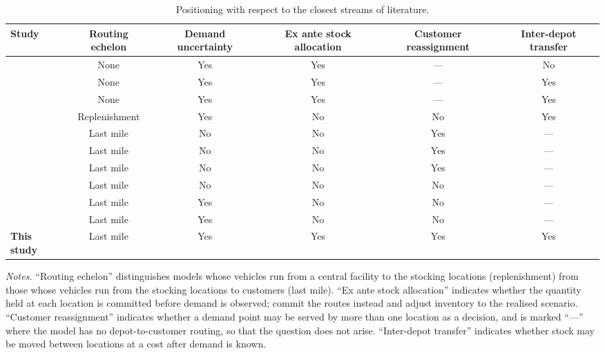 \documentclass[authoryear,final,3p,times]{elsarticle}
\theoremstyle{definition}
\theoremstyle{plain}
\begin{document}
\begin{table}[!htbp]
\centering
\caption{Positioning with respect to the closest streams of literature.}
\label{tab:literature_taxonomy}
\footnotesize
\setlength{\tabcolsep}{4pt}
\renewcommand{\arraystretch}{1.15}
\begin{tabular}{@{}lccccc@{}}
\toprule
Study & Routing echelon & Demand uncertainty & Ex ante stock allocation & Customer reassignment & Inter-depot transfer \\
\midrule
\citet{eppen1979centralization}   & None            & Yes & Yes & ---  & No  \\
\citet{ozdemir2006capacitated}    & None            & Yes & Yes & ---  & Yes \\
\citet{rosales2013retailer}       & None            & Yes & Yes & ---  & Yes \\
\citet{achamrah2022spare}         & Replenishment   & Yes & No  & No   & Yes \\
\citet{renaud1996tabu}            & Last mile       & No  & No  & Yes  & --- \\
\citet{cordeau1997vrp}            & Last mile       & No  & No  & Yes  & --- \\
\citet{vidal2012hybrid}           & Last mile       & No  & No  & Yes  & --- \\
\citet{bektas2011pollution}       & Last mile       & No  & No  & No   & --- \\
\citet{bertsimas1992vehicle}      & Last mile       & Yes & No  & No   & --- \\
\citet{laporte2002integer}        & Last mile       & Yes & No  & No   & --- \\
\textbf{This study}               & Last mile       & Yes & Yes & Yes  & Yes \\
\bottomrule
\end{tabular}

\vspace{3pt}
\begin{minipage}{0.95\textwidth}
{\footnotesize \textit{Notes.} ``Routing echelon'' distinguishes models whose
vehicles run from a central facility to the stocking locations
(replenishment) from those whose vehicles run from the stocking locations to
customers (last mile). ``Ex ante stock allocation'' indicates whether the
quantity held at each location is committed before demand is observed;
\citet{achamrah2022spare} commit the routes instead and adjust inventory to the
realised scenario. ``Customer reassignment'' indicates whether a demand point
may be served by more than one location as a decision, and is marked ``---''
where the model has no depot-to-customer routing, so that the question does not
arise. ``Inter-depot transfer'' indicates whether stock may be moved between
locations at a cost after demand is known.}
\end{minipage}
\end{table}
\end{document}
